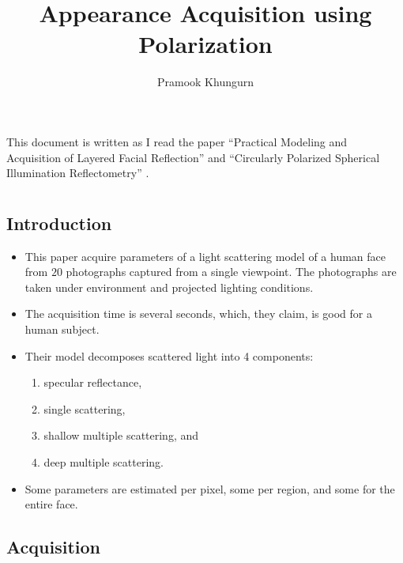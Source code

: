 \documentclass[10pt]{article}
\title{Appearance Acquisition using Polarization}
\author{Pramook Khungurn}
\begin{document}
	\maketitle

	This document is written as I read the paper ``Practical Modeling and Acquisition of Layered Facial Reflection'' \cite{Ghosh:2008} and ``Circularly Polarized Spherical Illumination Reflectometry'' \cite{Ghosh:2010}.

	\section{\cite{Ghosh:2008}}

	\subsection{Introduction}

	\begin{itemize}
		\item This paper acquire parameters of a light scattering model of a human face from $20$ photographs captured from a single viewpoint.  The photographs are taken under environment and projected lighting conditions.

		\item The acquisition time is several seconds, which, they claim, is good for a human subject.

		\item Their model decomposes scattered light into 4 components:
		\begin{enumerate}
			\item specular reflectance,
			\item single scattering,
			\item shallow multiple scattering, and
			\item deep multiple scattering. 
		\end{enumerate}

		\item Some parameters are estimated per pixel, some per region, and some for the entire face.
	\end{itemize}

	\subsection{Acquisition}
\end{document}
